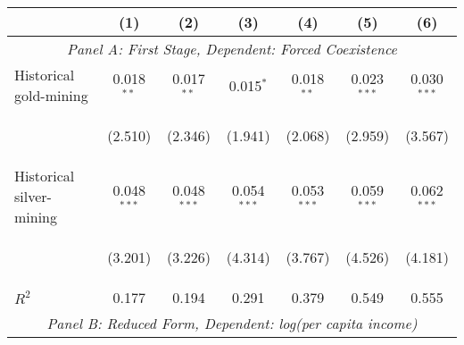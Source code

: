 \begin{center}
\begin{tabular}{lcccccc}
\hline \noalign{\smallskip} & (1) & (2) & (3) & (4) & (5) & (6)\\
\hline \multicolumn{7}{c}{\textit{Panel A: First Stage, Dependent: Forced Coexistence}}\\
\noalign{\smallskip}\noalign{\smallskip}Historical gold-mining & 0.018$ ^{**}$ & 0.017$ ^{**}$ & 0.015$ ^*$ & 0.018$ ^{**}$ & 0.023$ ^{***}$ & 0.030$ ^{***}$\\
 & \begin{footnotesize}(2.510)\end{footnotesize} & \begin{footnotesize}(2.346)\end{footnotesize} & \begin{footnotesize}(1.941)\end{footnotesize} & \begin{footnotesize}(2.068)\end{footnotesize} & \begin{footnotesize}(2.959)\end{footnotesize} & \begin{footnotesize}(3.567)\end{footnotesize}\\
\noalign{\smallskip}Historical silver-mining & 0.048$ ^{***}$ & 0.048$ ^{***}$ & 0.054$ ^{***}$ & 0.053$ ^{***}$ & 0.059$ ^{***}$ & 0.062$ ^{***}$\\
 & \begin{footnotesize}(3.201)\end{footnotesize} & \begin{footnotesize}(3.226)\end{footnotesize} & \begin{footnotesize}(4.314)\end{footnotesize} & \begin{footnotesize}(3.767)\end{footnotesize} & \begin{footnotesize}(4.526)\end{footnotesize} & \begin{footnotesize}(4.181)\end{footnotesize}\\
\noalign{\smallskip}$ R^2$ & 0.177 & 0.194 & 0.291 & 0.379 & 0.549 & 0.555\\
\multicolumn{7}{c}{\textit{Panel B: Reduced Form, Dependent: log(per capita income)}}\\

\end{tabular}
\end{center}
